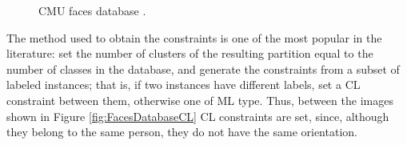 \clearpage

\begin{figure}[bth]
	\myfloatalign
	 \quad
	 \quad
	 \quad
	\caption[CMU faces database.]{CMU faces database \cite{davidson2007survey}.}\label{fig:CMUFacesDatabase}
\end{figure}

The method used to obtain the constraints is one of the most popular in the literature: set the number of clusters of the resulting partition equal to the number of classes in the database, and generate the constraints from a subset of labeled instances; that is, if two instances have different labels, set a \acs{CL} constraint between them, otherwise one of \acs{ML} type. Thus, between the images shown in Figure \ref{fig:FacesDatabaseCL} \acs{CL} constraints are set, since, although they belong to the same person, they do not have the same orientation.

